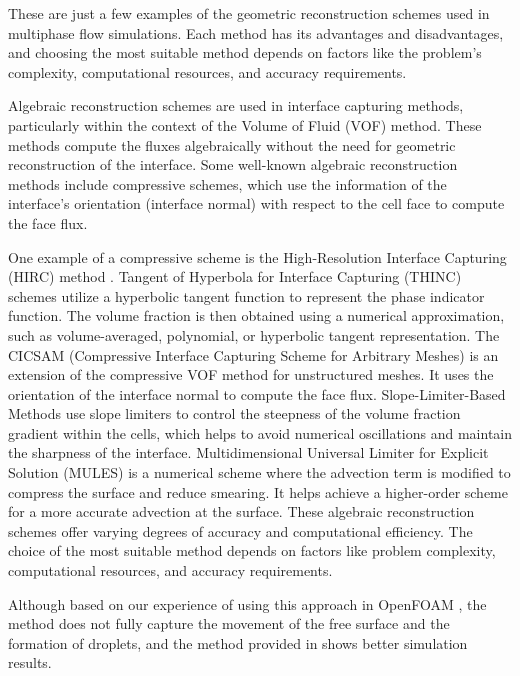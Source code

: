 These are just a few examples of the geometric reconstruction schemes used in multiphase flow simulations. Each method has its advantages and disadvantages, and choosing the most suitable method depends on factors like the problem's complexity, computational resources, and accuracy requirements.

Algebraic reconstruction schemes are used in interface capturing methods, particularly within the context of the Volume of Fluid (VOF) method. These methods compute the fluxes algebraically without the need for geometric reconstruction of the interface. Some well-known algebraic reconstruction methods include compressive schemes, which use the information of the interface's orientation (interface normal) with respect to the cell face to compute the face flux. 

One example of a compressive scheme is the High-Resolution Interface Capturing (\ac{HIRC}) method \cite{HIRC}. Tangent of Hyperbola for Interface Capturing (\ac{THINC}) \cite{THINC} schemes utilize a hyperbolic tangent function to represent the phase indicator function. The volume fraction is then obtained using a numerical approximation, such as volume-averaged, polynomial, or hyperbolic tangent representation. The \ac{CICSAM} (Compressive Interface Capturing Scheme for Arbitrary Meshes)\cite{CICSAM} is an extension of the compressive VOF method for unstructured meshes. It uses the orientation of the interface normal to compute the face flux. Slope-Limiter-Based Methods \cite{liu2021new} use slope limiters to control the steepness of the volume fraction gradient within the cells, which helps to avoid numerical oscillations and maintain the sharpness of the interface. Multidimensional Universal Limiter for Explicit Solution (\ac{MULES})\cite{MULES} is a numerical scheme where the advection term is modified to compress the surface and reduce smearing. It helps achieve a higher-order scheme for a more accurate advection at the surface. These algebraic reconstruction schemes offer varying degrees of accuracy and computational efficiency. The choice of the most suitable method depends on factors like problem complexity, computational resources, and accuracy requirements. 

Although based on our experience of using this approach in OpenFOAM \cite{MULES}, the method does not fully capture the movement of the free surface and the formation of droplets, and the method provided in \cite{roenby2019isoadvector} shows better simulation results.

